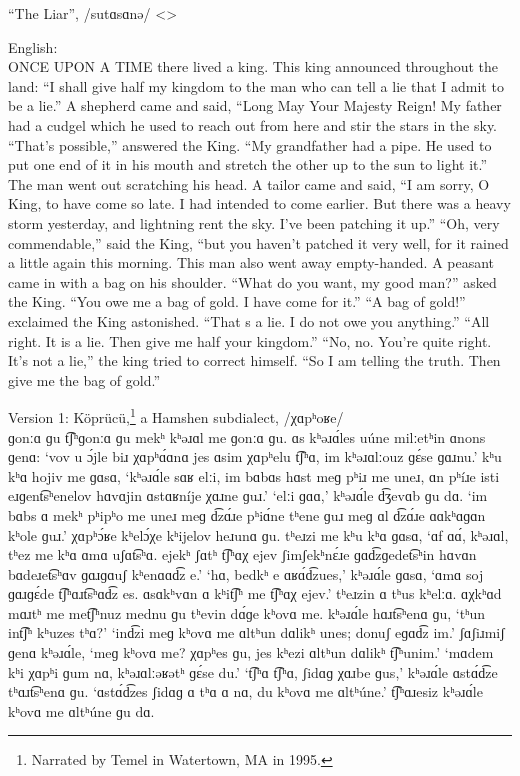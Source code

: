 \begin{exe}
\ex  ``The Liar'',  /sutɑsɑnǝ/ <>
\begin{xlist}
	\ex English: \\
ONCE UPON A TIME there lived a king. This king announced throughout the land:  
``I shall give half my kingdom to the man who can tell a lie that I admit to be a lie.''  
A shepherd came and said, ``Long May Your Majesty Reign! My father had a cudgel which he used to reach out from here and stir the stars in the sky.  
``That’s possible,'' answered the King. ``My grandfather had a pipe. He used to put one end of it in his mouth and stretch the other up to the sun to light it.''  
The man went out scratching his head.  
A tailor came and said, ``I am sorry, O King, to have come so late. I had intended to come earlier. But there was a heavy storm yesterday, and lightning rent the sky. I’ve been patching it up.'' 
``Oh, very commendable,'' said the King, ``but you haven’t patched it very well, for it rained a little again this morning.
This man also went away empty-handed.  
A peasant came in with a bag on his shoulder. ``What do you want, my good man?'' asked the King. ``You owe me a bag of gold. I have come for it.'' ``A bag of gold!'' exclaimed the King astonished. ``That s a lie. I do not owe you anything.''  
``All right. It is a lie. Then give me half your kingdom.''
``No, no. You’re quite right. It’s not a lie,'' the king tried to correct himself.   
``So I am telling the truth. Then give me the bag of gold.''

\ex Version 1: Köprücü,\footnote{  Narrated by Temel in Watertown, MA in 1995.}  a Hamshen subdialect, /χɑpʰoʁe/ \\

ɡonːɑ ɡu t͡ʃʰɡonːɑ ɡu mekʰ kʰǝɹɑl me ɡonːɑ ɡu.  ɑs kʰǝɹɑ́les uúne milːetʰin ɑnons ɡenɑ:  ‘vov u ɔ́jle biɹ χɑpʰɑ́ɑnɑ jes ɑsim χɑpʰelu t͡ʃʰɑ, im kʰǝɹɑlːouz ɡɛ́se ɡɑɹnu.’  kʰu kʰɑ hojiv me ɡɑsɑ, ‘kʰǝɹɑ́le sɑʁ elːi, im bɑbɑs hɑst meɡ pʰiɹ me uneɹ, ɑn pʰíɹe isti eɹɡent͡sʰenelov hɑvɑjin ɑstɑʁníje χɑɹne ɡuɹ.’  ‘elːi ɡɑɑ,’ kʰǝɹɑ́le d͡ʒevɑb ɡu dɑ.  ‘im bɑbs ɑ mekʰ pʰipʰo me uneɹ meɡ d͡zɑ́ɹe pʰiɑ́ne tʰene ɡuɹ meɡ ɑl d͡zɑ́ɹe ɑɑkʰɑɡɑn kʰole ɡuɹ.’  χɑpʰɔ́ʁe kʰelɔ́χe kʰijelov heɹunɑ ɡu.  tʰeɹzi me kʰu kʰɑ ɡɑsɑ, ‘ɑf ɑɑ́, kʰǝɹɑl, tʰez me kʰɑ ɑmɑ uʃɑt͡sʰɑ. ejekʰ ʃɑtʰ t͡ʃʰɑχ ejev ʃimʃekʰnɛ́ɹe ɡɑd͡zɡedet͡sʰin hɑvɑn bɑdeɹet͡sʰɑv ɡɑɹɡɑuʃ kʰenɑɑd͡z e.’  ‘hɑ, bedkʰ e ɑʁɑ́d͡zues,’ kʰǝɹɑ́le ɡɑsɑ, ‘ɑmɑ soj ɡɑɹɡɛ́de t͡ʃʰɑɹt͡sʰɑd͡z es.  ɑsɑkʰvɑn ɑ kʰit͡ʃʰ me t͡ʃʰɑχ ejev.’ tʰeɹzin ɑ tʰus kʰelːɑ.  ɑχkʰɑd mɑɹtʰ me met͡ʃʰnuz mednu ɡu tʰevin dɑ́ɡe kʰovɑ me.  kʰǝɹɑ́le hɑɹt͡sʰenɑ ɡu, ‘tʰun int͡ʃʰ kʰuzes tʰɑ?’  ‘ind͡zi meɡ kʰovɑ me ɑltʰun dɑlikʰ unes; donuʃ eɡɑd͡z im.’  ʃɑʃiɹmiʃ ɡenɑ kʰǝɹɑ́le, ‘meɡ kʰovɑ me?  χɑpʰes ɡu, jes kʰezi ɑltʰun dɑlikʰ t͡ʃʰunim.’  ‘mɑdem kʰi χɑpʰi ɡum nɑ, kʰǝɹɑlːǝʁǝtʰ ɡɛ́se du.’  ‘t͡ʃʰɑ t͡ʃʰɑ, ʃidɑɡ χɑɹbe ɡus,’ kʰǝɹɑ́le ɑstɑ́d͡ze tʰɑɹt͡sʰenɑ ɡu. ‘ɑstɑ́d͡zes ʃidɑɡ ɑ tʰɑ ɑ nɑ, du kʰovɑ me ɑltʰúne.’  t͡ʃʰɑɹesiz kʰǝɹɑ́le kʰovɑ me ɑltʰúne ɡu dɑ.


\end{xlist}
\end{exe}
